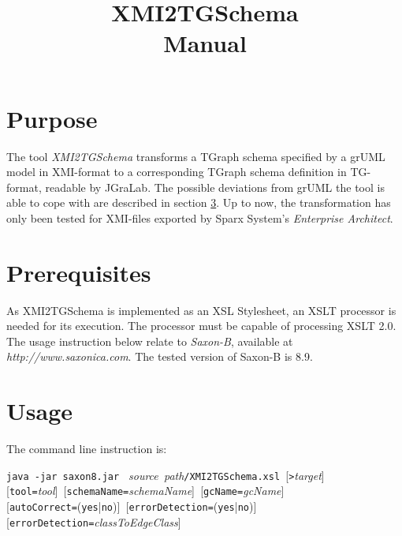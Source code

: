 \documentclass[a4paper]{article}
\title{\LARGE XMI2TGSchema\\Manual}
\begin{document}
	\maketitle
	\vspace{-6pt}
	
	\section{Purpose}
	The tool \emph{XMI2TGSchema} transforms a TGraph schema specified by a grUML model in XMI-format to a corresponding TGraph schema definition in TG-format, readable by JGraLab. The possible deviations from grUML the tool is able to cope with are described in section \ref{sec:Usage}. Up to now, the transformation has only been tested for XMI-files exported by Sparx System's \emph{Enterprise Architect}.
	
	\section{Prerequisites}
	As XMI2TGSchema is implemented as an XSL Stylesheet, an XSLT processor is needed for its execution. The processor must be capable of processing XSLT 2.0. The usage instruction below relate to \emph{Saxon-B}, available at \emph{http://www.saxonica.com}. The tested version of Saxon-B is 8.9.
	
	\section{Usage} \label{sec:Usage}
	The command line instruction is:
	
	\texttt{java -jar saxon8.jar } \emph{source}\texttt{ }\emph{path}\texttt{/XMI2TGSchema.xsl }[\texttt{>}\emph{target}]\texttt{ } \\ 
	\mbox{[}\texttt{tool=}\emph{tool}]\texttt{ }[\texttt{schemaName=}\emph{schemaName}]\texttt{ }[\texttt{gcName=}\emph{gcName}] \\
	\mbox{[}\texttt{autoCorrect=}(\texttt{yes}|\texttt{no})]\texttt{ }[\texttt{errorDetection=}(\texttt{yes}|\texttt{no})] \\
	\mbox{[}\texttt{errorDetection=}\emph{classToEdgeClass}]
\end{document}
